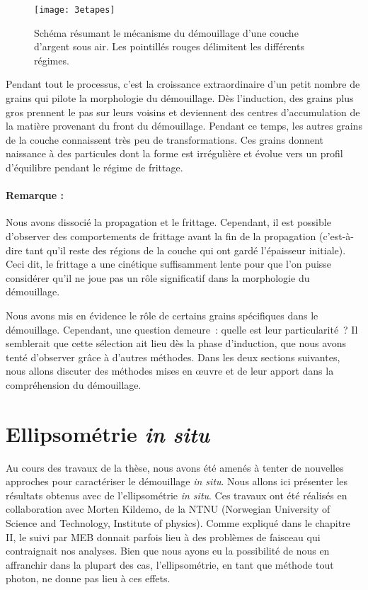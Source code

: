 \begin{figure}[h]
	\centering
	\texttt{[image: 3etapes]}
	\caption{Schéma résumant le mécanisme du démouillage d'une couche d'argent sous air. Les pointillés rouges délimitent les différents régimes.}
	\label{3etapes}
\end{figure}

Pendant tout le processus, c'est la croissance extraordinaire d'un petit nombre de grains qui pilote la morphologie du démouillage. Dès l'induction, des grains plus gros prennent le pas sur leurs voisins et deviennent des centres d'accumulation de la matière provenant du front du démouillage. Pendant ce temps, les autres grains de la couche connaissent très peu de transformations. Ces grains donnent naissance à des particules dont la forme est irrégulière et évolue vers un profil d'équilibre pendant le régime de frittage.\par

\paragraph*{Remarque :}
Nous avons dissocié la propagation et le frittage. Cependant, il est possible d'observer des comportements de frittage avant la fin de la propagation (c'est-à-dire tant qu'il reste des régions de la couche qui ont gardé l'épaisseur initiale). Ceci dit, le frittage a une cinétique suffisamment lente pour que l'on puisse considérer qu'il ne joue pas un rôle significatif dans la morphologie du démouillage.\par \vspace{12pt}

Nous avons mis en évidence le rôle de certains grains spécifiques dans le démouillage. Cependant, une question demeure~: quelle est leur particularité~? Il semblerait que cette sélection ait lieu dès la phase d'induction, que nous avons tenté d'observer grâce à d'autres méthodes. Dans les deux sections suivantes, nous allons discuter des méthodes mises en œuvre et de leur apport dans la compréhension du démouillage.\par 


\section{Ellipsométrie \textit{in situ}}
\label{sEllipso}
Au cours des travaux de la thèse, nous avons été amenés à tenter de nouvelles approches pour caractériser le démouillage \textit{in situ}. Nous allons ici présenter les résultats obtenus avec de l'ellipsométrie \textit{in situ}. Ces travaux ont été réalisés en collaboration avec Morten Kildemo, de la NTNU (Norwegian University of Science and Technology, Institute of physics). Comme expliqué dans le chapitre II, le suivi par MEB donnait parfois lieu à des problèmes de faisceau qui contraignait nos analyses. Bien que nous ayons eu la possibilité de nous en affranchir dans la plupart des cas, l'ellipsométrie, en tant que méthode tout photon, ne donne pas lieu à ces effets.\par

